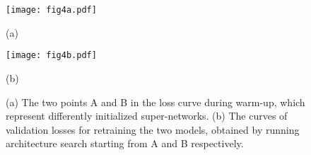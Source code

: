 \documentclass{article}
\begin{document}
\begin{table}[t]
    \centering
\end{table}
\begin{figure}[t]
\begin{minipage}[b]{0.48\linewidth}
        \centering
        \texttt{[image: fig4a.pdf]}
        \centerline{(a)}
    \end{minipage}
\begin{minipage}[b]{0.48\linewidth}
        \centering
        \texttt{[image: fig4b.pdf]}
        \centerline{(b)}
    \end{minipage}
    \vspace{-2mm}
    \caption{(a) The two points A and B in the loss curve during warm-up, which represent differently initialized super-networks. (b) The curves of validation losses for retraining the two models, obtained by running architecture search starting from A and B respectively.}
    \label{fig:method:effectSPI}
\end{figure}


\vspace{-2mm}
\end{document}
